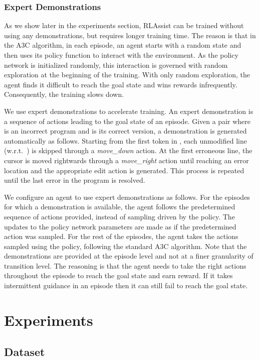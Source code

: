 \documentclass{article}
\begin{document}
\subsubsection{Expert Demonstrations}
As we show later in the experiments section, RLAssist can be trained without using any demonstrations, but requires longer training time.
The reason is that in the A3C algorithm, in each episode, an agent starts with a random state  and then uses its policy function to interact with the environment.
As the policy network is initialized randomly, this interaction is governed with random exploration at the beginning of the training.
With only random exploration, the agent finds it difficult to reach the goal state and wins rewards infrequently. Consequently, the training slows down.

We use expert demonstrations to accelerate training. 
An expert demonstration is a sequence of actions leading to the goal state of an episode.
Given a pair  where  is an incorrect program and  is its correct version, a demonstration is generated automatically as follows.
Starting from the first token in , each unmodified line (w.r.t.\ ) is skipped through a \emph{move\_down} action.
At the first erroneous line, the cursor is moved rightwards through a \emph{move\_right} action until reaching an error location and the appropriate edit action is generated. This process is repeated until the last error in the program is resolved.

We configure an agent to use expert demonstrations as follows.
For the episodes for which a demonstration is available, the agent follows the predetermined sequence of actions provided, instead of sampling driven by the policy.
The updates to the policy network parameters are made as if the predetermined action was sampled.
For the rest of the episodes, the agent takes the actions sampled using the policy, following the standard A3C algorithm.
Note that the demonstrations are provided at the episode level and not at a finer granularity of transition level.
The reasoning is that the agent needs to take the right actions throughout the episode to reach the goal state and earn reward. 
If it takes intermittent guidance in an episode then it can still fail to reach the goal state.
 \section{Experiments}

\subsection{Dataset}
\end{document}
